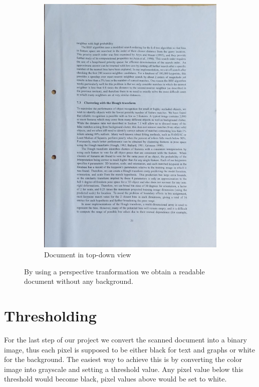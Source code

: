 \documentclass[bibliography=totoc]{scrartcl}
\begin{document}
\begin{figure}[ht!]
\begin{subfigure}[t]{0.3\linewidth}
		\includegraphics[width=\linewidth]{imgs/topdown/extreme_angle.jpg}
		\caption{Document in top-down view}
		\label{subfig:perspective_tranform}
	\end{subfigure}
	\caption{By using a perspective tranformation we obtain a readable document without any background.}
\end{figure}

\section{Thresholding}
For the last step of our project we convert the scanned document into a binary image, thus each pixel is supposed to be either black for text and graphs or white for the background.
The easiest way to achieve this is by converting the color image into grayscale and setting a threshold value.
Any pixel value below this threshold would become black, pixel values above would be set to white.
\end{document}
